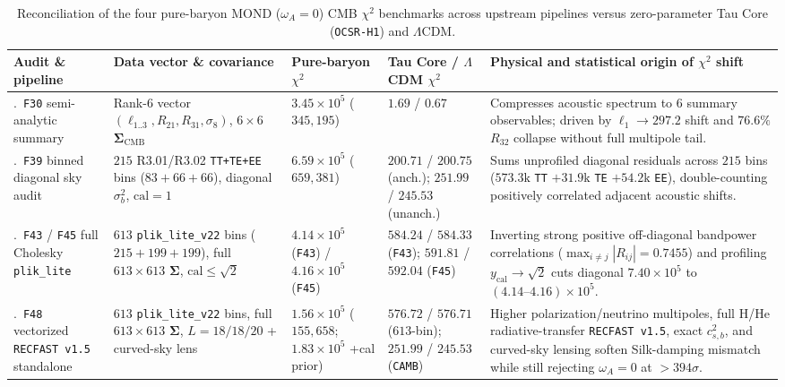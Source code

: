 \documentclass[11pt]{article}
\begin{document}
\begin{table}[ht!]
\centering
\caption{Reconciliation of the four pure-baryon MOND ($\omega_A=0$) CMB $\chi^2$ benchmarks across upstream pipelines versus zero-parameter Tau Core (\texttt{OCSR-H1}) and $\Lambda$CDM.}
\label{tab:mond-cmb-benchmarks}
\scriptsize
\renewcommand{\arraystretch}{1.22}
\begin{tabularx}{\textwidth}{@{}>{\raggedright\arraybackslash}p{2.2cm} >{\raggedright\arraybackslash}p{2.7cm} >{\raggedright\arraybackslash}p{2.1cm} >{\raggedright\arraybackslash}p{2.4cm} >{\raggedright\arraybackslash}X@{}}
\toprule
\textbf{Audit \& pipeline} & \textbf{Data vector \& covariance} & \textbf{Pure-baryon $\chi^2$} & \textbf{Tau Core / $\Lambda$CDM $\chi^2$} & \textbf{Physical and statistical origin of $\chi^2$ shift} \\
\midrule
1.\ \texttt{F30} semi-analytic summary & Rank-$6$ vector $(\ell_{1..3},R_{21},R_{31},\sigma_8)$, $6\times 6$ $\boldsymbol{\Sigma}_{\mathrm{CMB}}$ & $3.45\times 10^5$ ($345{,}195$) & $1.69$ / $0.67$ & Compresses acoustic spectrum to $6$ summary observables; driven by $\ell_1\to 297.2$ shift and $76.6\%$ $R_{32}$ collapse without full multipole tail. \\
2.\ \texttt{F39} binned diagonal sky audit & $215$ R3.01/R3.02 \texttt{TT+TE+EE} bins ($83+66+66$), diagonal $\sigma_b^2$, $\mathrm{cal}=1$ & $6.59\times 10^5$ ($659{,}381$) & $200.71$ / $200.75$ (anch.); $251.99$ / $245.53$ (unanch.) & Sums unprofiled diagonal residuals across $215$ bins ($573.3\mathrm{k}$ \texttt{TT} $+31.9\mathrm{k}$ \texttt{TE} $+54.2\mathrm{k}$ \texttt{EE}), double-counting positively correlated adjacent acoustic shifts. \\
3.\ \texttt{F43} / \texttt{F45} full Cholesky \texttt{plik\_\allowbreak{}lite} & $613$ \texttt{plik\_\allowbreak{}lite\_\allowbreak{}v22} bins ($215+199+199$), full $613\times 613$ $\boldsymbol{\Sigma}$, $\mathrm{cal}\le\sqrt{2}$ & $4.14\times 10^5$ (\texttt{F43}) / $4.16\times 10^5$ (\texttt{F45}) & $584.24$ / $584.33$ (\texttt{F43}); $591.81$ / $592.04$ (\texttt{F45}) & Inverting strong positive off-diagonal bandpower correlations ($\max_{i\neq j}|R_{ij}|=0.7455$) and profiling $y_{\mathrm{cal}}\to\sqrt{2}$ cuts diagonal $7.40\times 10^5$ to $(4.14\text{--}4.16)\times 10^5$. \\
4.\ \texttt{F48} vectorized \texttt{RECFAST v1.5} standalone & $613$ \texttt{plik\_\allowbreak{}lite\_\allowbreak{}v22} bins, full $613\times 613$ $\boldsymbol{\Sigma}$, $L=18/18/20$ + curved-sky lens & $1.56\times 10^5$ ($155{,}658$; $1.83\times 10^5$ +cal prior) & $576.72$ / $576.71$ ($613$-bin); $251.99$ / $245.53$ (\texttt{CAMB}) & Higher polarization/neutrino multipoles, full H/He radiative-transfer \texttt{RECFAST v1.5}, exact $c_{s,b}^2$, and curved-sky lensing soften Silk-damping mismatch while still rejecting $\omega_A=0$ at $>394\sigma$. \\
\bottomrule
\end{tabularx}
\end{table}
\end{document}
